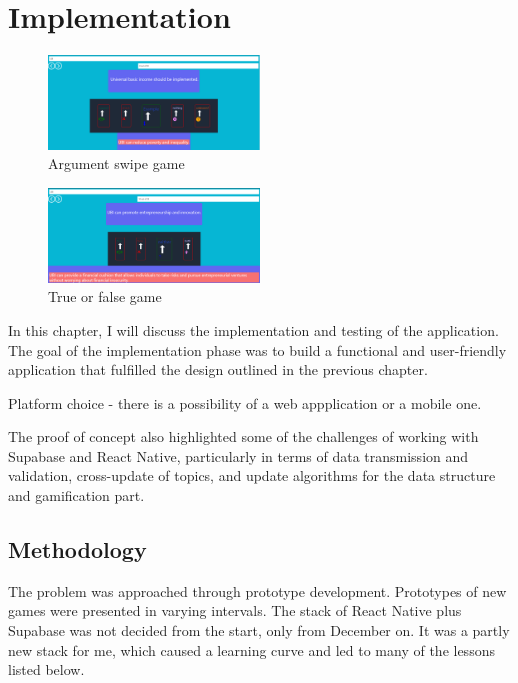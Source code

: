 \documentclass{report}
\begin{document}
\chapter{Implementation}

\begin{figure}[h]
    \centering
    \includegraphics[width=0.5\textwidth]{./images/swipe-game.png}
    \caption{Argument swipe game}
\end{figure}


\begin{figure}[h]
    \centering
    \includegraphics[width=0.5\textwidth]{./images/truth-game.png}
    \caption{True or false game}
\end{figure}

In this chapter, I will discuss the implementation and testing of the application. The goal of the implementation phase was to build a functional and user-friendly application that fulfilled the design outlined in the previous chapter.

Platform choice - there is a possibility of a web appplication or a mobile one.

The proof of concept also highlighted some of the challenges of working with Supabase and React Native, particularly in terms of data transmission and validation, cross-update of topics, and update algorithms for the data structure and gamification part.

\section{Methodology}
The problem was approached through prototype development. Prototypes of new games were presented in varying intervals. The stack of React Native plus Supabase was not decided from the start, only from December on. It was a partly new stack for me, which caused a learning curve and led to many of the lessons listed below.
\end{document}
